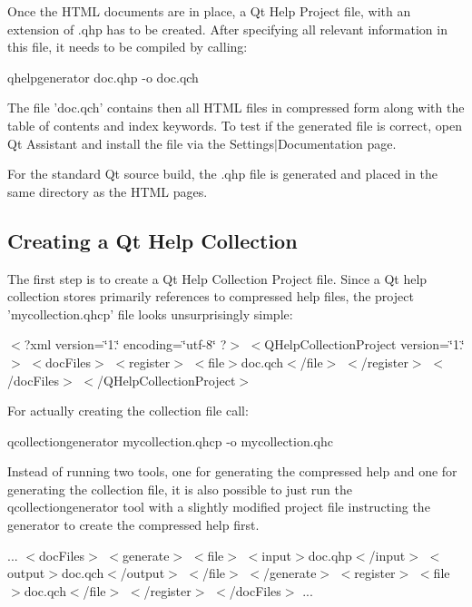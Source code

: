 Once the H\-T\-M\-L documents are in place, a Qt Help Project file, with an extension of .qhp has to be created. After specifying all relevant information in this file, it needs to be compiled by calling\-:

qhelpgenerator doc.\-qhp -\/o doc.\-qch

The file 'doc.\-qch' contains then all H\-T\-M\-L files in compressed form along with the table of contents and index keywords. To test if the generated file is correct, open Qt Assistant and install the file via the Settings$|$\-Documentation page.

For the standard Qt source build, the .qhp file is generated and placed in the same directory as the H\-T\-M\-L pages.\hypertarget{collection_collection_create}{}\subsection{Creating a Qt Help Collection}\label{collection_collection_create}
The first step is to create a Qt Help Collection Project file. Since a Qt help collection stores primarily references to compressed help files, the project 'mycollection.\-qhcp' file looks unsurprisingly simple\-:

$<$?xml version=\char`\"{}1.\char`\"{} encoding=\char`\"{}utf-\/8\char`\"{} ?$>$ $<$\-Q\-Help\-Collection\-Project version=\char`\"{}1.\char`\"{}$>$ $<$doc\-Files$>$ $<$register$>$ $<$file$>$doc.\-qch$<$/file$>$ $<$/register$>$ $<$/doc\-Files$>$ $<$/\-Q\-Help\-Collection\-Project$>$

For actually creating the collection file call\-:

qcollectiongenerator mycollection.\-qhcp -\/o mycollection.\-qhc

Instead of running two tools, one for generating the compressed help and one for generating the collection file, it is also possible to just run the qcollectiongenerator tool with a slightly modified project file instructing the generator to create the compressed help first.

... $<$doc\-Files$>$ $<$generate$>$ $<$file$>$ $<$input$>$doc.\-qhp$<$/input$>$ $<$output$>$doc.\-qch$<$/output$>$ $<$/file$>$ $<$/generate$>$ $<$register$>$ $<$file$>$doc.\-qch$<$/file$>$ $<$/register$>$ $<$/doc\-Files$>$ ...

